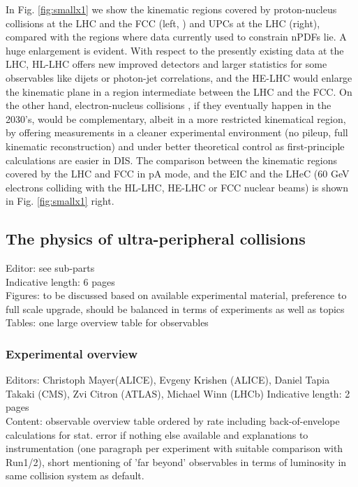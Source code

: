 \documentclass[../report.tex]{subfiles}
\begin{document}
In Fig. \ref{fig:smallx1} we show the kinematic regions covered by proton-nucleus collisions at the LHC and the FCC (left, \cite{Dainese:2016gch}) and UPCs at the LHC (right), compared with the regions where data currently used to constrain nPDFs lie. A huge enlargement is evident. With respect to the presently existing data at the LHC, HL-LHC offers new improved detectors and larger statistics for some observables like dijets or photon-jet correlations, and the HE-LHC would enlarge the kinematic plane in a region intermediate between the LHC and the FCC. On the other hand, electron-nucleus collisions \cite{AbelleiraFernandez:2012cc,Accardi:2012qut}, if they eventually happen in the 2030's, would be complementary, albeit in a more restricted kinematical region, by offering measurements in a cleaner experimental environment (no pileup, full kinematic reconstruction) and under better theoretical control as first-principle calculations are easier in DIS. The comparison between the kinematic regions covered by the LHC and FCC in pA mode, and the EIC \cite{Accardi:2012qut} and the LHeC \cite{AbelleiraFernandez:2012cc} (60 GeV electrons colliding with the HL-LHC, HE-LHC or FCC nuclear beams) is shown in Fig. \ref{fig:smallx1} right.


\subsection{The physics of ultra-peripheral collisions}
Editor: see sub-parts\\
Indicative length: 6 pages\\
Figures: to be discussed based on available experimental material, preference to full scale upgrade, should be balanced in terms of experiments as well as topics\\
Tables: one large overview table for observables
\subsubsection{Experimental overview}
Editors: Christoph Mayer(ALICE), Evgeny Krishen (ALICE), Daniel Tapia Takaki (CMS), Zvi Citron (ATLAS), Michael Winn (LHCb)
Indicative length: 2 pages\\
Content: observable overview table ordered by rate including back-of-envelope calculations for stat. error if nothing else available and explanations to instrumentation (one paragraph per experiment with suitable comparison with Run1/2), short mentioning of 'far beyond' observables in terms of luminosity in same collision system as default.
\end{document}
